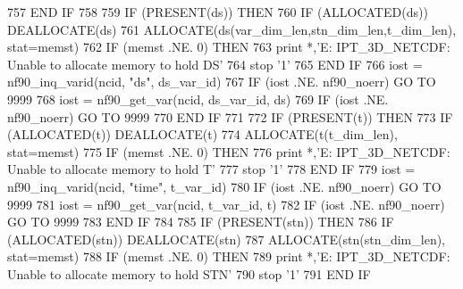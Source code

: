 \begin{DoxyCode}
757 \textcolor{keywordflow}{    END IF}
758 
759     \textcolor{keywordflow}{IF} (\textcolor{keyword}{PRESENT}(ds)) \textcolor{keywordflow}{THEN}
760         \textcolor{keywordflow}{IF} (\textcolor{keyword}{ALLOCATED}(ds))          \textcolor{keyword}{DEALLOCATE}(ds)
761         \textcolor{keyword}{ALLOCATE}(ds(var\_dim\_len,stn\_dim\_len,t\_dim\_len), stat=memst)
762         \textcolor{keywordflow}{IF} (memst .NE. 0) \textcolor{keywordflow}{THEN}
763             print *,\textcolor{stringliteral}{'E: IPT\_3D\_NETCDF: Unable to allocate memory to hold DS'}
764             stop \textcolor{stringliteral}{'1'}
765 \textcolor{keywordflow}{        END IF}
766         iost = nf90\_inq\_varid(ncid, \textcolor{stringliteral}{"ds"}, ds\_var\_id)
767         \textcolor{keywordflow}{IF} (iost .NE. nf90\_noerr) \textcolor{keywordflow}{GO TO} 9999
768         iost = nf90\_get\_var(ncid, ds\_var\_id, ds)
769         \textcolor{keywordflow}{IF} (iost .NE. nf90\_noerr) \textcolor{keywordflow}{GO TO} 9999
770 \textcolor{keywordflow}{    END IF}
771 
772     \textcolor{keywordflow}{IF} (\textcolor{keyword}{PRESENT}(t)) \textcolor{keywordflow}{THEN}
773         \textcolor{keywordflow}{IF} (\textcolor{keyword}{ALLOCATED}(t))           \textcolor{keyword}{DEALLOCATE}(t)
774         \textcolor{keyword}{ALLOCATE}(t(t\_dim\_len), stat=memst)
775         \textcolor{keywordflow}{IF} (memst .NE. 0) \textcolor{keywordflow}{THEN}
776             print *,\textcolor{stringliteral}{'E: IPT\_3D\_NETCDF: Unable to allocate memory to hold T'}
777             stop \textcolor{stringliteral}{'1'}
778 \textcolor{keywordflow}{        END IF}
779         iost = nf90\_inq\_varid(ncid, \textcolor{stringliteral}{"time"}, t\_var\_id)
780         \textcolor{keywordflow}{IF} (iost .NE. nf90\_noerr) \textcolor{keywordflow}{GO TO} 9999
781         iost = nf90\_get\_var(ncid, t\_var\_id, t)
782         \textcolor{keywordflow}{IF} (iost .NE. nf90\_noerr) \textcolor{keywordflow}{GO TO} 9999
783 \textcolor{keywordflow}{    END IF}
784 
785     \textcolor{keywordflow}{IF} (\textcolor{keyword}{PRESENT}(stn)) \textcolor{keywordflow}{THEN}
786         \textcolor{keywordflow}{IF} (\textcolor{keyword}{ALLOCATED}(stn))         \textcolor{keyword}{DEALLOCATE}(stn)
787         \textcolor{keyword}{ALLOCATE}(stn(stn\_dim\_len), stat=memst)
788         \textcolor{keywordflow}{IF} (memst .NE. 0) \textcolor{keywordflow}{THEN}
789             print *,\textcolor{stringliteral}{'E: IPT\_3D\_NETCDF: Unable to allocate memory to hold STN'}
790             stop \textcolor{stringliteral}{'1'}
791 \textcolor{keywordflow}{        END IF}

\end{DoxyCode}
